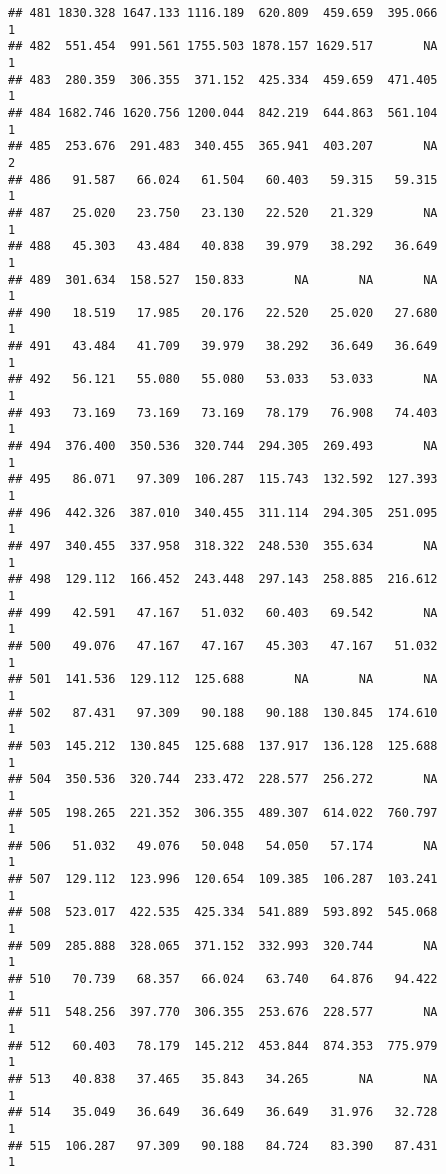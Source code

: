 \documentclass[
]{article}
\begin{document}
\begin{verbatim}
## 481 1830.328 1647.133 1116.189  620.809  459.659  395.066             1
## 482  551.454  991.561 1755.503 1878.157 1629.517       NA             1
## 483  280.359  306.355  371.152  425.334  459.659  471.405             1
## 484 1682.746 1620.756 1200.044  842.219  644.863  561.104             1
## 485  253.676  291.483  340.455  365.941  403.207       NA             2
## 486   91.587   66.024   61.504   60.403   59.315   59.315             1
## 487   25.020   23.750   23.130   22.520   21.329       NA             1
## 488   45.303   43.484   40.838   39.979   38.292   36.649             1
## 489  301.634  158.527  150.833       NA       NA       NA             1
## 490   18.519   17.985   20.176   22.520   25.020   27.680             1
## 491   43.484   41.709   39.979   38.292   36.649   36.649             1
## 492   56.121   55.080   55.080   53.033   53.033       NA             1
## 493   73.169   73.169   73.169   78.179   76.908   74.403             1
## 494  376.400  350.536  320.744  294.305  269.493       NA             1
## 495   86.071   97.309  106.287  115.743  132.592  127.393             1
## 496  442.326  387.010  340.455  311.114  294.305  251.095             1
## 497  340.455  337.958  318.322  248.530  355.634       NA             1
## 498  129.112  166.452  243.448  297.143  258.885  216.612             1
## 499   42.591   47.167   51.032   60.403   69.542       NA             1
## 500   49.076   47.167   47.167   45.303   47.167   51.032             1
## 501  141.536  129.112  125.688       NA       NA       NA             1
## 502   87.431   97.309   90.188   90.188  130.845  174.610             1
## 503  145.212  130.845  125.688  137.917  136.128  125.688             1
## 504  350.536  320.744  233.472  228.577  256.272       NA             1
## 505  198.265  221.352  306.355  489.307  614.022  760.797             1
## 506   51.032   49.076   50.048   54.050   57.174       NA             1
## 507  129.112  123.996  120.654  109.385  106.287  103.241             1
## 508  523.017  422.535  425.334  541.889  593.892  545.068             1
## 509  285.888  328.065  371.152  332.993  320.744       NA             1
## 510   70.739   68.357   66.024   63.740   64.876   94.422             1
## 511  548.256  397.770  306.355  253.676  228.577       NA             1
## 512   60.403   78.179  145.212  453.844  874.353  775.979             1
## 513   40.838   37.465   35.843   34.265       NA       NA             1
## 514   35.049   36.649   36.649   36.649   31.976   32.728             1
## 515  106.287   97.309   90.188   84.724   83.390   87.431             1

\end{verbatim}
\end{document}
